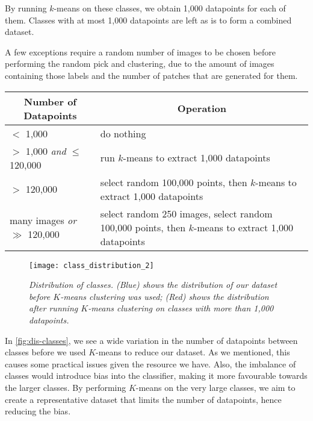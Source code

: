 By running $k$-means on these classes, we obtain 1,000 datapoints for each of them. Classes with at most 1,000 datapoints are left as is to form a combined dataset.

A few exceptions require a random number of images to be chosen before performing the random pick and clustering, due to the amount of images containing those labels and the number of patches that are generated for them.

\parbox{\linewidth} {
	\centering
	\begin{tabularx}{\textwidth}{|l|X|}
    \hline
    \multicolumn{1}{|c}{\textbf{Number of Datapoints}} & \multicolumn{1}{|c|}{\textbf{Operation}}
    \\ \hline
    $<$ 1,000 & do nothing 
    \\ \hline
    $>$ 1,000 \textit{and} $\leq$ 120,000 & run $k$-means to extract 1,000 datapoints 
    \\ \hline
    $>$ 120,000 & select random 100,000 points, then $k$-means to extract 1,000 datapoints 
    \\ \hline
    many images \textit{or} $\gg$ 120,000 & select random 250 images, select random 100,000 points, then $k$-means to extract 1,000 datapoints 
    \\ \hline
	\end{tabularx}
\label{tab:extract-sum}
}

\begin{figure}[H]
  \centering
  \texttt{[image: class\_distribution\_2]}
  \caption{\textit{Distribution of classes. (Blue) shows the distribution of our dataset before $K$-means clustering was used; (Red) shows the distribution after running $K$-means clustering on classes with more than 1,000 datapoints.}}
  \label{fig:dis-classes}
\end{figure} 

In \autoref{fig:dis-classes}, we see a wide variation in the number of datapoints between classes before we used $K$-means to reduce our dataset. As we mentioned, this causes some practical issues given the resource we have. Also, the imbalance of classes would introduce bias into the classifier, making it more favourable towards the larger classes. By performing $K$-means on the very large classes, we aim to create a representative dataset that limits the number of datapoints, hence reducing the bias.

